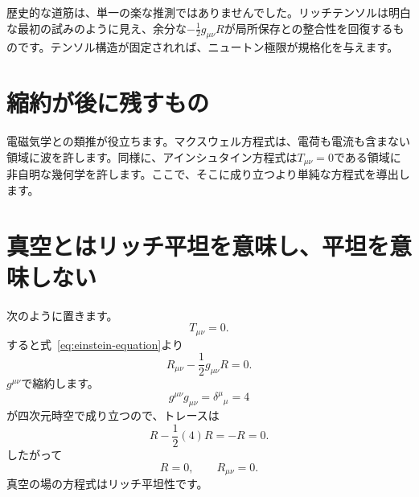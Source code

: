 歴史的な道筋は、単一の楽な推測ではありませんでした。リッチテンソルは明白な最初の試みのように見え、余分な\(-\tfrac12g_{\mu\nu}R\)が局所保存との整合性を回復するものです。テンソル構造が固定されれば、ニュートン極限が規格化を与えます。

\section{縮約が後に残すもの}

\begin{classroomqa}
\end{classroomqa}

電磁気学との類推が役立ちます。マクスウェル方程式は、電荷も電流も含まない領域に波を許します。同様に、アインシュタイン方程式は\(T_{\mu\nu}=0\)である領域に非自明な幾何学を許します。ここで、そこに成り立つより単純な方程式を導出します。

\section{真空とはリッチ平坦を意味し、平坦を意味しない}

次のように置きます。
\begin{equation}
 T_{\mu\nu}=0.
\end{equation}
すると式~\eqref{eq:einstein-equation}より
\begin{equation}
 R_{\mu\nu}-\frac12g_{\mu\nu}R=0.
 \label{eq:vacuum-einstein}
\end{equation}
\(g^{\mu\nu}\)で縮約します。
\begin{equation}
 g^{\mu\nu}g_{\mu\nu}
 =\delta^\mu{}_\mu=4
\end{equation}
が四次元時空で成り立つので、トレースは
\begin{equation}
 R-\frac12(4)R=-R=0.
\end{equation}
したがって
\begin{equation}
 R=0,
 \qquad
 R_{\mu\nu}=0.
 \label{eq:ricci-flat}
\end{equation}
真空の場の方程式はリッチ平坦性です。

